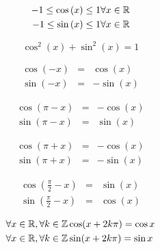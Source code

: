 
\begin{multicols}{2}

\begin{eqnarray}
-1 \leq \cos{(x)} \leq 1 & \forall x \in \mathbb{R} \\  
-1 \leq \sin{(x)} \leq 1 & \forall x \in \mathbb{R}
\end{eqnarray}


\begin{equation}
\cos^2{(x)}+\sin^2{(x)} = 1
\label{cos2plussin2}
\end{equation}

\begin{eqnarray}
\cos(-x) & = & \cos{(x)}\\
\sin(-x) & = & -\sin{(x)}
\end{eqnarray}

\begin{eqnarray}
\cos(\pi - x) & = & -\cos(x)\\
\sin(\pi - x) & = &\sin(x)
\end{eqnarray}

\begin{eqnarray}
\cos(\pi + x) & = & -\cos(x)\\
\sin(\pi + x) & = & -\sin(x)
\end{eqnarray}

\begin{eqnarray}
\cos(\frac{\pi}{2} - x) & = & \sin(x)\\
\sin(\frac{\pi}{2} - x) & = &\cos(x)
\end{eqnarray}

\end{multicols}


\begin{eqnarray}{ }
\forall x \in \mathbb{R}, \forall k \in \mathbb{Z} & \cos (x + 2k \pi)  =  \cos{x} \\ 
\forall x \in \mathbb{R}, \forall k \in \mathbb{Z} & \sin (x + 2k \pi)  =  \sin{x}  
\end{eqnarray}








%
%
%
